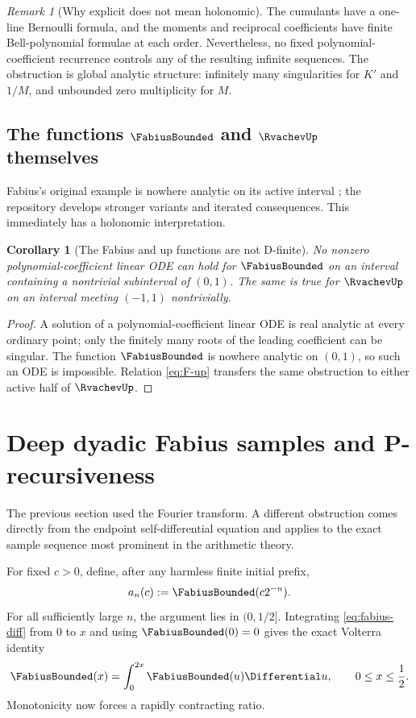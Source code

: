 \documentclass[11pt]{article}
\numberwithin{equation}{section}
\newtheorem{corollary}[theorem]{Corollary}
\theoremstyle{definition}
\theoremstyle{remark}
\newtheorem{remark}[theorem]{Remark}
\begin{document}
\begin{remark}[Why explicit does not mean holonomic]
The cumulants have a one-line Bernoulli formula, and the moments and reciprocal
coefficients have finite Bell-polynomial formulae at each order.  Nevertheless,
no fixed polynomial-coefficient recurrence controls any of the resulting
infinite sequences.  The obstruction is global analytic structure: infinitely
many singularities for $K'$ and $1/M$, and unbounded zero multiplicity for
$M$.
\end{remark}

\subsection{The functions
\texorpdfstring{$\FabiusBounded$ and $\RvachevUp$}{bounded Fabius and up}
themselves}

Fabius's original example is nowhere analytic on its active interval
\cite{Fabius}; the repository develops stronger variants and iterated
consequences.  This immediately has a holonomic interpretation.

\begin{corollary}[The Fabius and up functions are not D-finite]
\label{cor:F-up-not-Dfinite}
No nonzero polynomial-coefficient linear ODE can hold for $\FabiusBounded$ on an interval
containing a nontrivial subinterval of $(0,1)$.  The same is true for $\RvachevUp$ on
an interval meeting $(-1,1)$ nontrivially.
\end{corollary}
\begin{proof}
A solution of a polynomial-coefficient linear ODE is real analytic at every
ordinary point; only the finitely many roots of the leading coefficient can be
singular.  The function $\FabiusBounded$ is nowhere analytic on $(0,1)$, so such an ODE is
impossible.  Relation \eqref{eq:F-up} transfers the same obstruction to either
active half of $\RvachevUp$.
\end{proof}

\section{Deep dyadic Fabius samples and P-recursiveness}
\label{sec:deep-samples}

The previous section used the Fourier transform.  A different obstruction comes
directly from the endpoint self-differential equation and applies to the exact
sample sequence most prominent in the arithmetic theory.

For fixed $c>0$, define, after any harmless finite initial prefix,
\begin{equation}
 a_n(c):=\FabiusBounded(c2^{-n}).
 \label{eq:deep-sample}
\end{equation}
For all sufficiently large $n$, the argument lies in $(0,1/2]$.  Integrating
\eqref{eq:fabius-diff} from $0$ to $x$ and using $\FabiusBounded(0)=0$ gives the exact
Volterra identity
\begin{equation}
 \FabiusBounded(x)=\int_0^{2x}\FabiusBounded(u)\Differential u,
 \qquad 0\le x\le\frac12.
 \label{eq:F-Volterra}
\end{equation}
Monotonicity now forces a rapidly contracting ratio.
\end{document}
